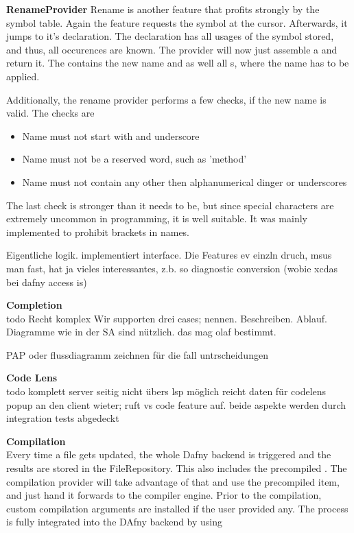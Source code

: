 \textbf{RenameProvider}
Rename is another feature that profits strongly by the symbol table.
Again the feature requests the symbol at the cursor.
Afterwards, it jumps to it's declaration.
The declaration has all usages of the symbol stored, and thus, all occurences are known.
The provider will now just assemble a  and return it.
The  contains the new name and as well all s, where the name has to be applied.

Additionally, the rename provider performs a few checks, if the new name is valid.
The checks are
\begin{itemize}
    \item Name must not start with and underscore
    \item Name must not be a reserved word, such as 'method'
    \item Name must not contain any other then alphanumerical dinger or underscores
\end{itemize}

The last check is stronger than it needs to be, but since special characters are extremely uncommon in programming, it is well suitable.
It was mainly implemented to prohibit brackets in names.


Eigentliche logik. implementiert interface. Die Features ev einzln druch, msus man fast, hat ja vieles interessantes, z.b. so diagnostic conversion (wobie xcdas bei dafny access is)

\textbf{Completion}\\
todo
Recht komplex
Wir supporten drei cases; nennen. Beschreiben.
Ablauf. Diagramme wie in der SA sind nützlich. das mag olaf bestimmt. 

PAP oder flussdiagramm zeichnen für die fall untrscheidungen

\textbf{Code Lens}\\
todo
komplett server seitig nicht übers lsp möglich
reicht daten für codelens popup an den client wieter; ruft vs code feature auf.
beide aspekte werden durch integration tests abgedeckt

\textbf{Compilation}\\
Every time a file gets updated, the whole Dafny backend is triggered and the results are stored in the FileRepository.
This also includes the precompiled .
The compilation provider will take advantage of that and use the precompiled item, and just hand it forwards to the compiler engine.
Prior to the compilation, custom compilation arguments are installed if the user provided any.
The process is fully integrated into the DAfny backend by using

